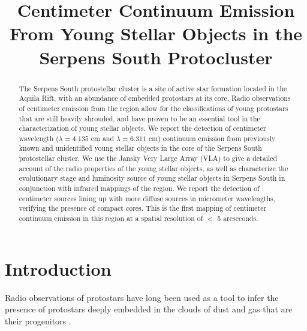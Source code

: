 \documentclass[iop]{aastex}
\begin{document}
\title{Centimeter Continuum Emission From Young Stellar Objects in the Serpens South Protocluster}


\begin{abstract}
The Serpens South protostellar cluster is a site of active star formation located in the Aquila Rift, with an abundance of embedded protostars at its core. Radio observations of centimeter emission from the region allow for the classifications of young protostars that are still heavily shrouded, and have proven to be an essential tool in the characterization of young stellar objects. We report the detection of centimeter wavelength ($\lambda=4.135$ cm and $\lambda=6.311$ cm) continuum emission from previously known and unidentified young stellar objects in the core of the Serpens South protostellar cluster. We use the Jansky Very Large Array (VLA) to give a detailed account of the radio properties of the young stellar objects, as well as characterize the evolutionary stage and luminosity source of young stellar objects in Serpens South in conjunction with infrared mappings of the region. We report the detection of centimeter sources lining up with more diffuse sources in micrometer wavelengths, verifying the presence of compact cores. This is the first mapping of centimeter continuum emission in this region at a spatial resolution of $<$ 5 arcseconds.

\end{abstract}



\section{Introduction}

Radio observations of protostars have long been used as a tool to infer the presence of protostars deeply embedded in the clouds of dust and gas that are their progenitors \citep{Anglada95}. 
\end{document}
